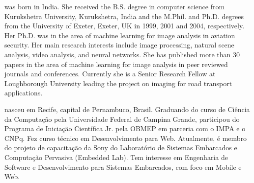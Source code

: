 \documentclass{classe_cn}                 %
\begin{document}
 was born in India. She received the B.S. 
degree in computer science from Kurukshetra University, Kurukshetra, 
India and the M.Phil. and Ph.D. degrees from the University of Exeter, 
Exeter, UK in 1999, 2001 and 2004, respectively. Her Ph.D. was in the 
area of machine learning for image analysis in aviation security. Her 
main research interests include image processing, natural scene analysis,
video analysis, and neural networks. She has published more than 30 papers
in the area of machine learning for image analysis in peer reviewed 
journals and conferences. Currently she is a Senior Research Fellow at
Loughborough University leading the project on imaging for road transport
applications.   

 nasceu em Recife, capital de Pernambuco, Brasil. Graduando do curso de Ciência da Computação pela Universidade Federal de Campina Grande, participou do Programa de Iniciação Científica Jr. pela OBMEP em parceria com o IMPA e o CNPq. Fez curso técnico em Desenvolvimento para Web. Atualmente, é membro do projeto de capacitação da Sony do Laboratório de Sistemas Embarcados e Computação Pervasiva (Embedded Lab). Tem interesse em Engenharia de Software e Desenvolvimento para Sistemas Embarcados, com foco em Mobile e Web.



\end{document}
